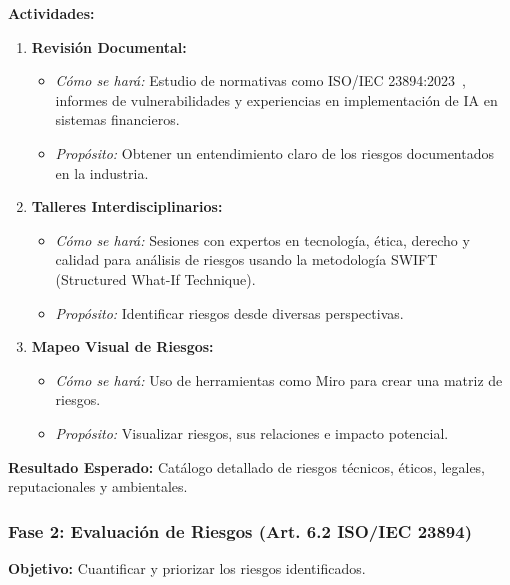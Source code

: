 \documentclass[12pt]{article}
\begin{document}
\textbf{Actividades:}
\begin{enumerate}
    \item \textbf{Revisión Documental:}
        \begin{itemize}
            \item \textit{Cómo se hará:} Estudio de normativas como ISO/IEC 23894:2023~\cite{iso23894}, informes de vulnerabilidades y experiencias en implementación de IA en sistemas financieros.
            \item \textit{Propósito:} Obtener un entendimiento claro de los riesgos documentados en la industria.
        \end{itemize}
    \item \textbf{Talleres Interdisciplinarios:}
        \begin{itemize}
            \item \textit{Cómo se hará:} Sesiones con expertos en tecnología, ética, derecho y calidad para análisis de riesgos usando la metodología SWIFT (Structured What-If Technique).
            \item \textit{Propósito:} Identificar riesgos desde diversas perspectivas.
        \end{itemize}
    \item \textbf{Mapeo Visual de Riesgos:}
        \begin{itemize}
            \item \textit{Cómo se hará:} Uso de herramientas como Miro para crear una matriz de riesgos.
            \item \textit{Propósito:} Visualizar riesgos, sus relaciones e impacto potencial.
        \end{itemize}
\end{enumerate}

\textbf{Resultado Esperado:} Catálogo detallado de riesgos técnicos, éticos, legales, reputacionales y ambientales.

\subsubsection{Fase 2: Evaluación de Riesgos (Art. 6.2 ISO/IEC 23894)}
\textbf{Objetivo:} Cuantificar y priorizar los riesgos identificados.
\end{document}
